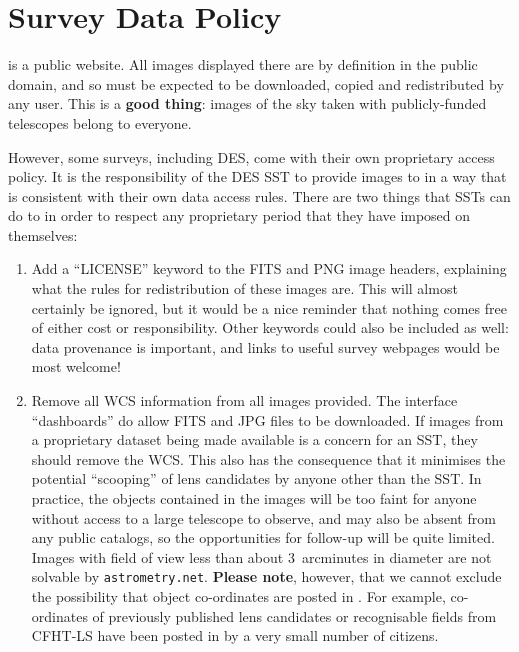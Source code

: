 \documentclass[a4paper,twocolumn]{article}
\begin{document}


\section{Survey Data Policy}
\label{sec:data}

\SW is a public website. All images displayed there are by definition in the
public domain, and so must be expected to be downloaded, copied and
redistributed by any \SW user. This is a \textbf{good thing}: images of the sky taken
with publicly-funded telescopes belong to everyone. 

However, some surveys, including DES, come with their own proprietary access policy. It is the responsibility
of the DES SST to provide images to \SW in a way that is consistent
with their own data access rules. There are two things that SSTs can
do to in order to respect any proprietary period that they have imposed on
themselves:
\begin{enumerate}

\item Add a ``LICENSE'' keyword to the FITS and PNG image headers, explaining
what the rules for redistribution of these images are. This will almost
certainly be ignored, but it would be a nice reminder that nothing comes free
of either cost or responsibility. Other keywords could also be included as
well: data provenance is important, and links to useful survey webpages would
be most welcome!

\item Remove all WCS information from all images provided. The \SW interface ``dashboards'' do allow FITS and JPG files to be downloaded. If images from a proprietary dataset being made available is a concern for an SST, they should remove the WCS. This also has the consequence that it minimises the potential ``scooping'' of  lens candidates by anyone other than the SST. 
In practice, the objects contained in the \SW images will be too faint
for anyone without access to a large telescope to observe, and may also be
absent from any public catalogs, so the opportunities for follow-up will be
quite limited. Images
with field of view less than about 3~arcminutes in diameter are not solvable
by \texttt{astrometry.net}. \textbf{Please note}, however, that we cannot exclude the possibility that object co-ordinates are posted in \Talk. For example, co-ordinates of previously published lens candidates or recognisable fields from CFHT-LS have been posted in \Talk by a very small number of citizens.

\end{enumerate}
\end{document}
